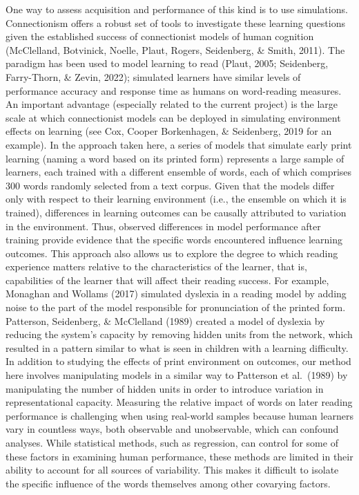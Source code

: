 \documentclass[
  ,man,floatsintext]{apa6}
\begin{document}
One way to assess acquisition and performance of this kind is to use simulations. Connectionism offers a robust set of tools to investigate these learning questions given the established success of connectionist models of human cognition (McClelland, Botvinick, Noelle, Plaut, Rogers, Seidenberg, \& Smith, 2011). The paradigm has been used to model learning to read (Plaut, 2005; Seidenberg, Farry-Thorn, \& Zevin, 2022); simulated learners have similar levels of performance accuracy and response time as humans on word-reading measures. An important advantage (especially related to the current project) is the large scale at which connectionist models can be deployed in simulating environment effects on learning (see Cox, Cooper Borkenhagen, \& Seidenberg, 2019 for an example). In the approach taken here, a series of models that simulate early print learning (naming a word based on its printed form) represents a large sample of learners, each trained with a different ensemble of words, each of which comprises 300 words randomly selected from a text corpus. Given that the models differ only with respect to their learning environment (i.e., the ensemble on which it is trained), differences in learning outcomes can be causally attributed to variation in the environment. Thus, observed differences in model performance after training provide evidence that the specific words encountered influence learning outcomes.
This approach also allows us to explore the degree to which reading experience matters relative to the characteristics of the learner, that is, capabilities of the learner that will affect their reading success. For example, Monaghan and Wollams (2017) simulated dyslexia in a reading model by adding noise to the part of the model responsible for pronunciation of the printed form. Patterson, Seidenberg, \& McClelland (1989) created a model of dyslexia by reducing the system's capacity by removing hidden units from the network, which resulted in a pattern similar to what is seen in children with a learning difficulty. In addition to studying the effects of print environment on outcomes, our method here involves manipulating models in a similar way to Patterson et al.~(1989) by manipulating the number of hidden units in order to introduce variation in representational capacity.
Measuring the relative impact of words on later reading performance is challenging when using real-world samples because human learners vary in countless ways, both observable and unobservable, which can confound analyses. While statistical methods, such as regression, can control for some of these factors in examining human performance, these methods are limited in their ability to account for all sources of variability. This makes it difficult to isolate the specific influence of the words themselves among other covarying factors.
\end{document}
